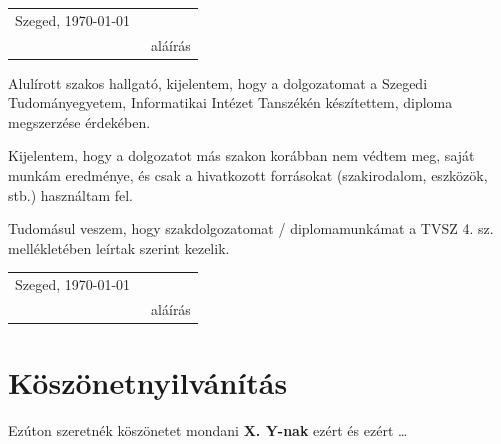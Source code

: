 \documentclass[12pt]{report}
\theoremstyle{definition}
\begin{document}
\vspace*{2cm}

\begin{tabular}{lc}
	Szeged, \today\
	\hspace{2cm} & \makebox[6cm]{\dotfill} \\
	             & aláírás                 \\
\end{tabular}


\vspace*{4cm}


\noindent
Alulírott \makebox[4cm]{\dotfill} szakos hallgató, kijelentem, hogy a dolgozatomat a Szegedi Tudományegyetem, Informatikai Intézet \makebox[4cm]{\dotfill} Tanszékén készítettem, \makebox[4cm]{\dotfill} diploma megszerzése érdekében.

Kijelentem, hogy a dolgozatot más szakon korábban nem védtem meg, saját munkám eredménye, és csak a hivatkozott forrásokat (szakirodalom, eszközök, stb.) használtam fel.

Tudomásul veszem, hogy szakdolgozatomat / diplomamunkámat a TVSZ 4. sz. mellékletében leírtak szerint kezelik.

\vspace*{2cm}

\begin{tabular}{lc}
	Szeged, \today\
	\hspace{2cm} & \makebox[6cm]{\dotfill} \\
	             & aláírás                 \\
\end{tabular}





\chapter*{Köszönetnyilvánítás}

Ezúton szeretnék köszönetet mondani \textbf{X. Y-nak} ezért és ezért \ldots


%
%

\end{document}
